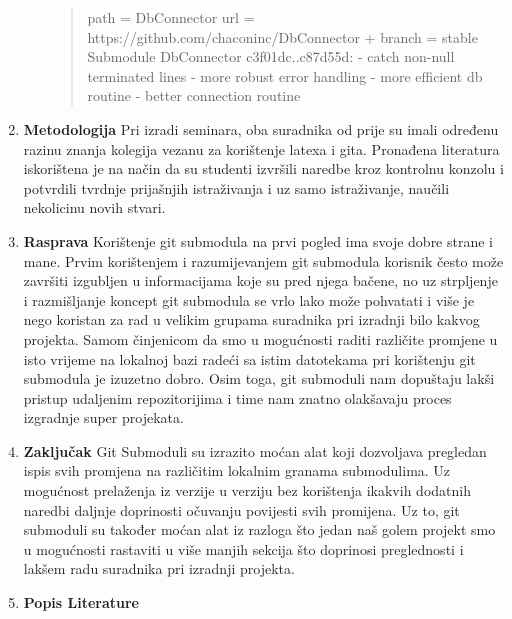 \documentclass {article}
\begin{document}
\begin{enumerate}
\begin{enumerate}
\begin{quote}
\newline         path = DbConnector
\newline         url = https://github.com/chaconinc/DbConnector
\newline +       branch = stable
\newline Submodule DbConnector c3f01dc..c87d55d:
\newline   - catch non-null terminated lines
\newline   - more robust error handling
\newline   - more efficient db routine
\newline   - better connection routine
\newpage
    \end{quote}
      \end{enumerate}
\item {\textbf{Metodologija}}
\newline
\newline Pri izradi seminara, oba suradnika od prije su imali određenu razinu znanja kolegija vezanu za korištenje latexa i gita. Pronađena literatura iskorištena je na način da su studenti izvršili naredbe kroz kontrolnu konzolu i potvrdili tvrdnje prijašnjih istraživanja i uz samo istraživanje, naučili nekolicinu novih stvari.
\newline
\item {\textbf{Rasprava}}
\newline
\newline Korištenje git submodula na prvi pogled ima svoje dobre strane i mane. \newline Prvim korištenjem i razumijevanjem git submodula korisnik često može završiti izgubljen u informacijama koje su pred njega bačene, no uz strpljenje i razmišljanje koncept git submodula se vrlo lako može pohvatati i više je nego koristan za rad u velikim grupama suradnika pri izradnji bilo kakvog projekta. Samom činjenicom da smo u mogućnosti raditi različite promjene u isto vrijeme na lokalnoj bazi radeći sa istim datotekama pri korištenju git submodula je izuzetno dobro. Osim toga, git submoduli nam dopuštaju lakši pristup udaljenim repozitorijima i time nam znatno olakšavaju proces izgradnje super projekata.
\newline
\item {\textbf{Zaključak}} \newline
\newline
Git Submoduli su izrazito moćan alat koji dozvoljava pregledan ispis svih promjena na različitim lokalnim granama submodulima. Uz mogućnost prelaženja iz verzije u verziju bez korištenja ikakvih dodatnih naredbi daljnje doprinosti očuvanju povijesti svih promijena. Uz to, git submoduli su također moćan alat iz razloga što jedan naš golem projekt smo u mogućnosti rastaviti u više manjih sekcija što doprinosi preglednosti i lakšem radu suradnika pri izradnji projekta.
\newpage
\item{\textbf{Popis Literature}}




\end{enumerate}
\end{document}

